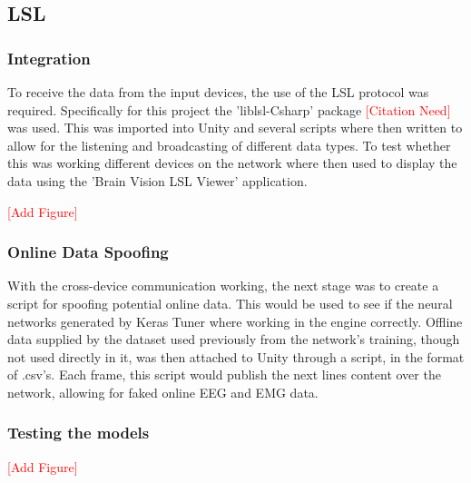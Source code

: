 \documentclass[11pt, a4paper]{article}
\newcommand{\addfigure}
{\hfill 

\textcolor{red}{[Add Figure]}

\hfill}
\newcommand{\addcitation}{\textcolor{red}{[Citation Need]}}
\begin{document}
\pagebreak
\subsection{LSL}
\subsubsection{Integration}
To receive the data from the input devices, the use of the LSL protocol was required. Specifically for this project the 'liblsl-Csharp' package \addcitation{} was used. This was imported into Unity and several scripts where then written to allow for the listening and broadcasting of different data types. To test whether this was working different devices on the network where then used to display the data using the 'Brain Vision LSL Viewer' application.

\addfigure %

\subsubsection{Online Data Spoofing}
With the cross-device communication working, the next stage was to create a script for spoofing potential online data. This would be used to see if the neural networks generated by Keras Tuner where working in the engine correctly. Offline data supplied by the dataset used previously from the network's training, though not used directly in it, was then attached to Unity through a script, in the format of .csv's. Each frame, this script would publish the next lines content over the network, allowing for faked online EEG and EMG data.

\hfill

\subsubsection{Testing the models}



\addfigure %
\end{document}
